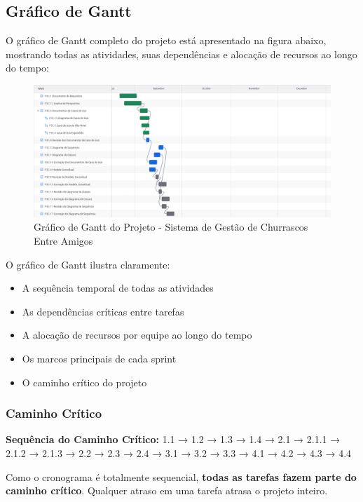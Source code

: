 \subsection{Gráfico de Gantt}

O gráfico de Gantt completo do projeto está apresentado na figura abaixo, mostrando todas as atividades, suas dependências e alocação de recursos ao longo do tempo:

\begin{figure}[H]
    \centering
    \includegraphics[width=\textwidth]{images/projeto_3___churrasco_2025-10-01_04.09pm.png}
    \caption{Gráfico de Gantt do Projeto - Sistema de Gestão de Churrascos Entre Amigos}
    \label{fig:gantt_chart}
\end{figure}

O gráfico de Gantt ilustra claramente:
\begin{itemize}
    \item A sequência temporal de todas as atividades
    \item As dependências críticas entre tarefas
    \item A alocação de recursos por equipe ao longo do tempo
    \item Os marcos principais de cada sprint
    \item O caminho crítico do projeto
\end{itemize}

\subsubsection{Caminho Crítico}
\textbf{Sequência do Caminho Crítico:} 1.1 → 1.2 → 1.3 → 1.4 → 2.1 → 2.1.1 → 2.1.2 → 2.1.3 → 2.2 → 2.3 → 2.4 → 3.1 → 3.2 → 3.3 → 4.1 → 4.2 → 4.3 → 4.4

Como o cronograma é totalmente sequencial, \textbf{todas as tarefas fazem parte do caminho crítico}. Qualquer atraso em uma tarefa atrasa o projeto inteiro.

